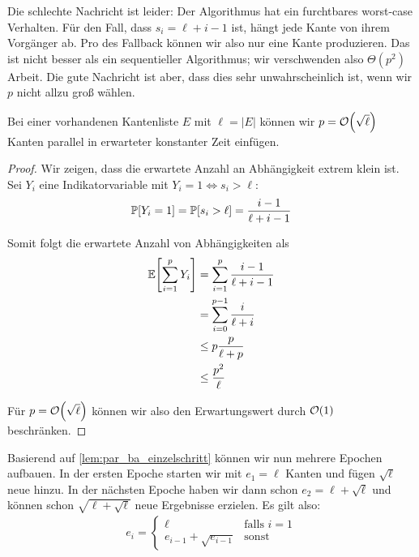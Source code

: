 Die schlechte Nachricht ist leider:
Der Algorithmus hat ein furchtbares worst-case Verhalten.
Für den Fall, dass $s_i = \ell + i - 1$ ist, hängt jede Kante von ihrem Vorgänger ab.
Pro  des Fallback können wir also nur eine Kante produzieren.
Das ist nicht besser als ein sequentieller Algorithmus; wir verschwenden also $\Theta(p^2)$ Arbeit.
Die gute Nachricht ist aber, dass dies sehr unwahrscheinlich ist, wenn wir $p$ nicht allzu groß wählen.

\begin{lemma}\label{lem:par_ba_einzelschritt}
    Bei  einer vorhandenen Kantenliste $E$ mit $\ell = |E|$ können wir $p = \mathcal{O}\!\left(\sqrt{\ell}\right)$ Kanten parallel in erwarteter konstanter Zeit einfügen.
\end{lemma}

\begin{proof}
    Wir zeigen, dass die erwartete Anzahl an Abhängigkeit extrem klein ist.
    Sei $Y_i$ eine Indikatorvariable mit $Y_i = 1 \Leftrightarrow s_i > \ell$:
    \begin{align}
        \mathbb{P}\!\left[Y_i = 1\right] = \mathbb{P}\!\left[s_i > \ell\right] = \frac{i - 1}{\ell + i - 1}
    \end{align}

    \noindent
    Somit folgt die erwartete Anzahl von Abhängigkeiten als
    \begin{align}
        \mathbb{E}\!\left[\sum_{i=1}^p Y_i\right] & = \sum_{i=1}^{p} \frac{i - 1}{\ell + i - 1} \\
                                & = \sum_{i=0}^{p-1} \frac{i}{\ell + i}       \\
                                & \le p \frac{p}{\ell + p}                    \\
                                & \le \frac{p^2}{\ell}
    \end{align}

    \noindent
    Für $p = \mathcal{O}\!\left(\sqrt{\ell}\right)$ können wir also den Erwartungswert durch $\mathcal{O}\!\left(1\right)$  beschränken.
\end{proof}

Basierend auf \cref{lem:par_ba_einzelschritt} können wir nun mehrere Epochen aufbauen.
In der ersten Epoche starten wir mit $e_1 = \ell$ Kanten und fügen $\sqrt{\ell}$ neue hinzu.
In der nächsten Epoche haben wir dann schon $e_2 = \ell + \sqrt{\ell}$ und können schon $\sqrt{\ell + \sqrt{\ell}}$ neue Ergebnisse erzielen.
Es gilt also:
\begin{align}
    e_i = \begin{cases}
        \ell                     & \text{falls } i = 1 \\
        e_{i-1} + \sqrt{e_{i-1}} & \text{sonst}
    \end{cases}
\end{align}

